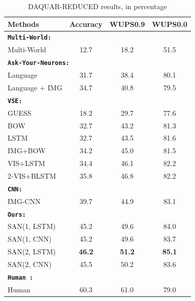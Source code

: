\documentclass[10pt,twocolumn,letterpaper]{article}
\begin{document}
\begin{table}
      \centering
  \begin{tabular}{l  c  c  c }
    \toprule
    Methods & Accuracy & WUPS0.9 &  WUPS0.0
    \\
    \midrule
    \multicolumn{4}{l}{
    {\bf \texttt{Multi-World:}} \cite{malinowski2014multi}} \\
    Multi-World & 12.7 & 18.2 & 51.5 \\
    \midrule
    \multicolumn{4}{l}{
    {\bf \texttt{Ask-Your-Neurons:}} \cite{malinowski2015ask}} \\
    Language & 31.7 & 38.4 & 80.1 \\
    Language + IMG & 34.7 & 40.8 & 79.5 \\
    \midrule
    {\bf\texttt{VSE:}} \cite{ren2015imageqa} \\
    GUESS & 18.2 & 29.7 & 77.6 \\
    BOW & 32.7 & 43.2 & 81.3 \\
    LSTM & 32.7 & 43.5 & 81.6 \\
    IMG+BOW & 34.2 & 45.0 & 81.5 \\
    VIS+LSTM & 34.4 & 46.1 & 82.2 \\
    2-VIS+BLSTM & 35.8 & 46.8 & 82.2 \\
    \midrule
    {\bf \texttt{CNN:}} \cite{ma2015learning} \\
    IMG-CNN & 39.7 & 44.9 & 83.1 \\
    \midrule
    {\bf \texttt{Ours:}} \\
    SAN(1, LSTM) & 45.2 & 49.6 & 84.0 \\
    SAN(1, CNN) & 45.2 & 49.6 & 83.7 \\
    SAN(2, LSTM) & {\bf 46.2} & {\bf 51.2} & {\bf 85.1} \\
    SAN(2, CNN) & 45.5 & 50.2 & 83.6 \\
    \midrule
    {\bf \texttt{Human :}\cite{malinowski2014multi}} \\
    Human & 60.3 & 61.0 & 79.0 \\
    \bottomrule
  \end{tabular}
  \caption{DAQUAR-REDUCED results, in percentage}
  \label{tab:daquar_reduced_results}
  \vspace{-0.5cm}
\end{table}
\end{document}
